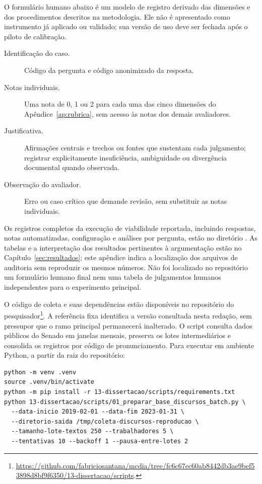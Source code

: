 O formulário humano abaixo é um modelo de registro derivado das dimensões e dos procedimentos descritos na metodologia. Ele não é apresentado como instrumento já aplicado ou validado; sua versão de uso deve ser fechada após o piloto de calibração.

\begin{description}
  \item[Identificação do caso.] Código da pergunta e código anonimizado da resposta.
  \item[Notas individuais.] Uma nota de 0, 1 ou 2 para cada uma das cinco dimensões do Apêndice~\ref{ap:rubrica}, sem acesso às notas dos demais avaliadores.
  \item[Justificativa.] Afirmações centrais e trechos ou fontes que sustentam cada julgamento; registrar explicitamente insuficiência, ambiguidade ou divergência documental quando observada.
  \item[Observação do avaliador.] Erro ou caso crítico que demande revisão, sem substituir as notas individuais.
\end{description}

Os registros completos da execução de viabilidade reportada, incluindo respostas, notas automatizadas, configuração e análises por pergunta, estão no diretório . As tabelas e a interpretação dos resultados pertinentes à argumentação estão no Capítulo~\ref{sec:resultados}; este apêndice indica a localização dos arquivos de auditoria sem reproduzir os mesmos números. Não foi localizado no repositório um formulário humano final nem uma tabela de julgamentos humanos independentes para o experimento principal.

\label{ap:reproducao}

O código de coleta e suas dependências estão disponíveis no repositório do pesquisador\footnote{\url{https://github.com/fabriciosantana/mcdia/tree/fc6c67ec60ab8442db3ae9bef53898d8bf9f6350/13-dissertacao/scripts}.}. A referência fixa identifica a versão consultada nesta redação, sem pressupor que o ramo principal permanecerá inalterado. O script consulta dados públicos do Senado em janelas mensais, preserva os lotes intermediários e consolida os registros por código de pronunciamento. Para executar em ambiente Python, a partir da raiz do repositório:

\begin{verbatim}
python -m venv .venv
source .venv/bin/activate
python -m pip install -r 13-dissertacao/scripts/requirements.txt
python 13-dissertacao/scripts/01_preparar_base_discursos_batch.py \
  --data-inicio 2019-02-01 --data-fim 2023-01-31 \
  --diretorio-saida /tmp/coleta-discursos-reproducao \
  --tamanho-lote-textos 250 --trabalhadores 5 \
  --tentativas 10 --backoff 1 --pausa-entre-lotes 2
\end{verbatim}

